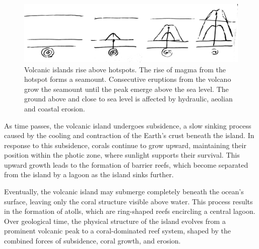 \begin{figure}[t]
    \centering
    \includegraphics[width = \linewidth]{other_images/Drawings/Volcano.jpg}
    \caption{Volcanic islands rise above hotspots. The rise of magma from the hotspot forms a seamount. Consecutive eruptions from the volcano grow the seamount until the peak emerge above the sea level. The ground above and close to sea level is affected by hydraulic, aeolian and coastal erosion.}
    \label{fig:coral-island_island-growth}
\end{figure}

As time passes, the volcanic island undergoes subsidence, a slow sinking process caused by the cooling and contraction of the Earth's crust beneath the island. In response to this subsidence, corals continue to grow upward, maintaining their position within the photic zone, where sunlight supports their survival. This upward growth leads to the formation of barrier reefs, which become separated from the island by a lagoon as the island sinks further.

Eventually, the volcanic island may submerge completely beneath the ocean's surface, leaving only the coral structure visible above water. This process results in the formation of atolls, which are ring-shaped reefs encircling a central lagoon. Over geological time, the physical structure of the island evolves from a prominent volcanic peak to a coral-dominated reef system, shaped by the combined forces of subsidence, coral growth, and erosion.

